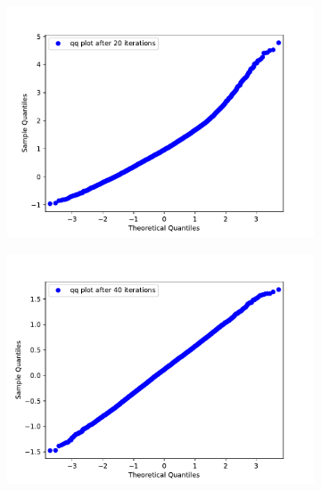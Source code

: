 \documentclass{scrartcl}
\begin{document}
\begin{figure}[H]
\begin{subfigure}[c]{0.32\textwidth}
				\includegraphics[width=\textwidth]{../imgs/harmonic_oscillator_track/track_10010000_qq_20.pdf}
			\end{subfigure}
			\begin{subfigure}[c]{0.32\textwidth}
				\includegraphics[width=\textwidth]{../imgs/harmonic_oscillator_track/track_10010000_qq_40.pdf}
			\end{subfigure}
			\begin{subfigure}[c]{0.32\textwidth}

\end{subfigure}
\end{figure}
\end{document}
